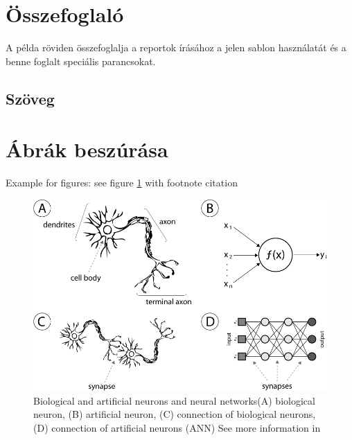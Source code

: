 \section{Összefoglaló}

A példa röviden összefoglalja a reportok írásához a jelen sablon használatát és a benne foglalt speciális parancsokat.

\subsection{Szöveg}
\lipsum

\section{Ábrák beszúrása}\label{sec:figures}

Example for figures: see figure \ref{fig:neuron} with footnote citation

\begin{figure}[H]
    \centering
    \includegraphics[width=\textwidth]{img/neuron.png}
    \caption[Biological and artificial neurons and neural networks]{\centering Biological and artificial neurons and neural networks\footnotemark \newline (A) biological neuron, (B) artificial neuron, (C) connection of biological neurons, (D) connection of artificial neurons (ANN) \newline
    See more information in \cite{goodfellow_deep_learning}}
    \label{fig:neuron}
\end{figure}




